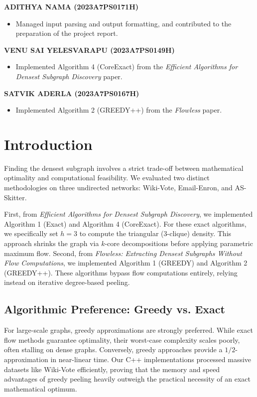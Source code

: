 \documentclass[12pt,a4paper]{article}
\begin{document}
\noindent\textbf{ADITHYA NAMA (2023A7PS0171H)}
\begin{itemize}
    \item Managed input parsing and output formatting, and contributed to the preparation of the project report.
\end{itemize}

\noindent\textbf{VENU SAI YELESVARAPU (2023A7PS0149H)}
\begin{itemize}
    \item Implemented Algorithm 4 (CoreExact) from the \textit{Efficient Algorithms for Densest Subgraph Discovery} paper.
\end{itemize}

\noindent\textbf{SATVIK ADERLA (2023A7PS0167H)}
\begin{itemize}
    \item Implemented Algorithm 2 (GREEDY++) from the \textit{Flowless} paper.
\end{itemize}

\pagebreak

\tableofcontents 
\pagebreak
\section{Introduction}

Finding the densest subgraph involves a strict trade-off between mathematical optimality and computational feasibility. We evaluated two distinct methodologies on three undirected networks: Wiki-Vote, Email-Enron, and AS-Skitter. 

First, from \textit{Efficient Algorithms for Densest Subgraph Discovery}, we implemented Algorithm 1 (Exact) and Algorithm 4 (CoreExact). For these exact algorithms, we specifically set $h=3$ to compute the triangular (3-clique) density. This approach shrinks the graph via $k$-core decompositions before applying parametric maximum flow. Second, from \textit{Flowless: Extracting Densest Subgraphs Without Flow Computations}, we implemented Algorithm 1 (GREEDY) and Algorithm 2 (GREEDY++). These algorithms bypass flow computations entirely, relying instead on iterative degree-based peeling.

\subsection*{Algorithmic Preference: Greedy vs. Exact}

For large-scale graphs, greedy approximations are strongly preferred. While exact flow methods guarantee optimality, their worst-case complexity scales poorly, often stalling on dense graphs. Conversely, greedy approaches provide a $1/2$-approximation in near-linear time. Our C++ implementations processed massive datasets like Wiki-Vote efficiently, proving that the memory and speed advantages of greedy peeling heavily outweigh the practical necessity of an exact mathematical optimum.
\end{document}
